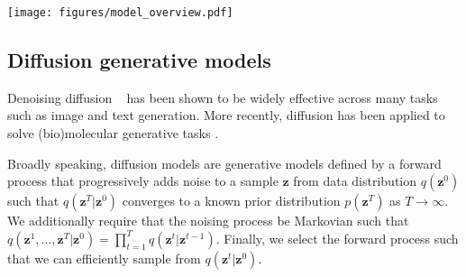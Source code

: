\documentclass{article}
\theoremstyle{plain}
\theoremstyle{definition}
\theoremstyle{remark}
\newcommand{\ours}{DiffMS\xspace}
\begin{document}


\begin{figure*}
    \centering
    \texttt{[image: figures/model\_overview.pdf]}
    \caption{Model architecture of \ours. \textbf{A)}~The spectrum encoder first assigns chemical formulae to peaks in an experimental spectrum and then learns an embedding vector through a formula transformer. The encoder is pretrained to predict Morgan fingerprints~\citep{morgan1965generation} from spectra. \textbf{B)}~The graph decoder generates the target adjacency matrix by discrete diffusion conditioned on the spectrum embedding and node (atom) features. The graph decoder is pretrained with pairs of structures and fingerprints from virtual chemical libraries. We scale up the decoder pretraining to exploit the virtually-infinite number of available fingerprint-structure pairs relative to the small number of available spectrum-structure pairs, mitigating the challenge of fingerprint-to-molecule generation found non-trivial by \citet{le2020neuraldecipher}. \textbf{C)}~\ours integrates the spectrum encoder and graph decoder to generate the structure annotation as a denoising process applied to a graph with randomly generated edges. It is finetuned end-to-end on labeled molecule-spectrum data.} %
    \label{fig:model-overview}
\end{figure*}



\subsection{Diffusion generative models}
Denoising diffusion ~\citep{pmlr-v37-sohl-dickstein15, ho2020denoisingdiffusionprobabilisticmodels} has been shown to be widely effective across many tasks such as image \citep{song2020score, saharia2022photorealistic, karras2022elucidating} and text \citep{li2022diffusion, austin2023structureddenoisingdiffusionmodels} generation. More recently, diffusion has been applied to solve (bio)molecular generative tasks 
\citep{corso2023diffdockdiffusionstepstwists, Watson2023DeND, zeni2024mattergengenerativemodelinorganic}. 

Broadly speaking, diffusion models are generative models defined by a forward process that progressively adds noise to a sample $\bm{z}$ from data distribution $q(\bm{z}^0)$ such that $q(\bm{z}^T | \bm{z}^0)$ converges to a known prior distribution $p(\bm{z}^T)$ as $T \to \infty$. We additionally require that the noising process be Markovian such that $q(\bm{z}^1, \dots, \bm{z}^T | \bm{z}^0) = \prod_{t=1}^Tq(\bm{z}^t | \bm{z}^{t-1})$. Finally, we select the forward process such that we can efficiently sample from $q(\bm{z}^t | \bm{z}^0)$.
\end{document}
